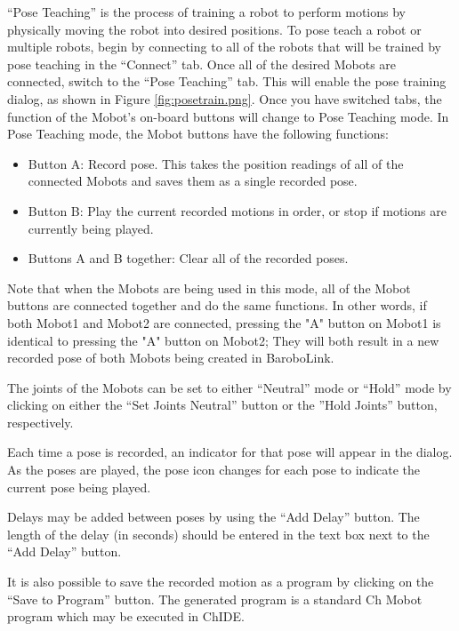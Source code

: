 \documentclass{article}
\begin{document}
``Pose Teaching'' is the process of training a robot to perform motions by physically
moving the robot into desired positions. To pose teach a robot or multiple robots,
begin by connecting to all of the robots that will be trained by pose teaching
in the ``Connect'' tab. Once all of the desired Mobots are connected, switch to
the ``Pose Teaching'' tab. This will enable the pose training dialog, as shown
in Figure \ref{fig:posetrain.png}.  Once you have switched tabs, the function of the
Mobot's on-board buttons will change to Pose Teaching mode. In Pose Teaching mode,
the Mobot buttons have the following functions:
\begin{itemize}
\item Button A: Record pose. This takes the position readings of all of the
connected Mobots and saves them as a single recorded pose.
\item Button B: Play the current recorded motions in order, or stop if motions are currently being played.
\item Buttons A and B together: Clear all of the recorded poses.
\end{itemize}

Note that when the Mobots are being used in this mode, all of the Mobot buttons are
connected together and do the same functions. In other words, if both Mobot1 and Mobot2 are connected, pressing the "A" button
on Mobot1 is identical to pressing the "A" button on Mobot2; They will both result
in a new recorded pose of both Mobots being created in BaroboLink.

The joints of the Mobots can be set to either ``Neutral'' mode or ``Hold'' mode by clicking
on either the ``Set Joints Neutral'' button or the ''Hold Joints'' button, respectively. 

Each time a pose is recorded, an indicator for that pose will appear in the dialog. As the
poses are played, the pose icon changes for each pose to indicate the current pose being played.

Delays may be added between poses by using the ``Add Delay'' button. The length of the delay (in seconds)
should be entered in the text box next to the ``Add Delay'' button.

It is also possible to save the recorded motion as a program by clicking on the ``Save to Program'' 
button. The generated program is a standard Ch Mobot program which may be executed 
in ChIDE. 
\end{document}
